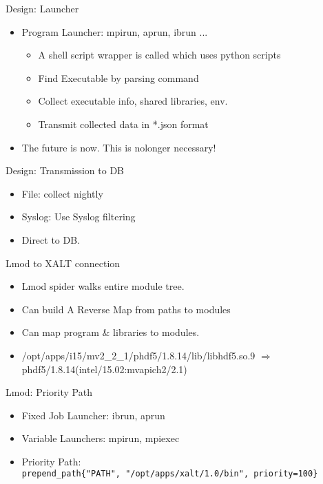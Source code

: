\documentclass{beamer}
\begin{document}
\begin{frame}{Design: Launcher}
  \begin{itemize}
    \item Program Launcher: mpirun, aprun, ibrun ...
      \begin{itemize}
        \item A shell script wrapper is called which uses python scripts
        \item Find Executable by parsing command
        \item Collect executable info, shared libraries, env.
        \item Transmit collected data in *.json format
      \end{itemize}
    \item The future is now.  This is nolonger necessary!
  \end{itemize}
\end{frame}

\begin{frame}{Design: Transmission to DB}
  \begin{itemize}
    \item File: collect nightly
    \item Syslog: Use Syslog filtering
    \item Direct to DB.
  \end{itemize}
\end{frame}

\begin{frame}{Lmod to XALT connection}
  \begin{itemize}
    \item Lmod spider walks entire module tree.
    \item Can build A Reverse Map from paths to modules
    \item Can map program \& libraries to modules.
    \item /opt/apps/i15/mv2\_2\_1/phdf5/1.8.14/lib/libhdf5.so.9
      $\Rightarrow$ phdf5/1.8.14(intel/15.02:mvapich2/2.1)
  \end{itemize}
\end{frame}

\begin{frame}{Lmod: Priority Path}
  \begin{itemize}
    \item Fixed Job Launcher: ibrun, aprun
    \item Variable Launchers: mpirun, mpiexec
    \item Priority Path: \\
      \texttt{prepend\_path\{"PATH", "/opt/apps/xalt/1.0/bin", priority=100\}}
  \end{itemize}
\end{frame}
\end{document}
